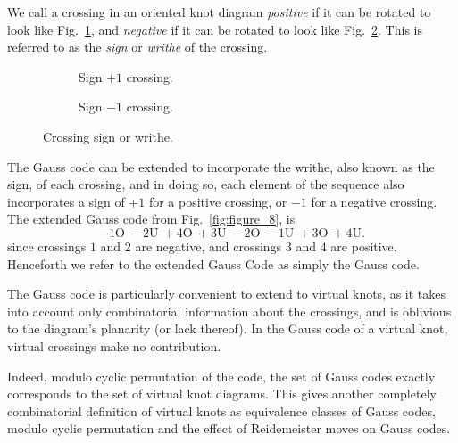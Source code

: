 \documentclass[12pt]{report}
\renewcommand{\over}{\text{O}}
\newcommand{\under}{\text{U}}
\theoremstyle{upright}
\begin{document}
We call a crossing in an oriented knot diagram \textit{positive} if it can be rotated to look like Fig.~\ref{fig:cross_pos}, and \textit{negative} if it can be rotated to look like Fig.~\ref{fig:cross_neg}. This is referred to as the \textit{sign} or \textit{writhe} of the crossing.

\begin{figure}[hbt]
	\centering
	\hspace*{\fill}
	\begin{subfigure}[b]{0.4 \textwidth}
		\centering
		\def\svgscale{0.28}
		
		\caption{Sign $+1$ crossing.}
		\label{fig:cross_pos}
	\end{subfigure}
	\hspace*{\fill} \hspace*{\fill}	\hspace*{\fill}
	\begin{subfigure}[b]{0.4 \textwidth}
		\centering
		\def\svgscale{0.28}
		
		\caption{Sign $-1$ crossing.}
		\label{fig:cross_neg}
	\end{subfigure}
	\hspace*{\fill} 
	\caption{Crossing sign or writhe.}
	\label{fig:crossing-sign}
\end{figure}

The Gauss code can be extended to incorporate the writhe, also known as the sign, of each crossing, and in doing so, each element of the sequence also incorporates a sign of $+1$ for a positive crossing, or $-1$ for a negative crossing. The extended Gauss code from Fig.~\ref{fig:figure_8}, is
\[-1\over\ -2\under\ +4\over\ +3\under\ -2\over\ -1\under\ +3\over\ +4\under.\]
since crossings $1$ and $2$ are negative, and crossings $3$ and $4$ are positive. Henceforth we refer to the extended Gauss Code as simply the Gauss code.

The Gauss code is particularly convenient to extend to virtual knots, as it takes into account only combinatorial information about the crossings, and is oblivious to the diagram's planarity (or lack thereof). In the Gauss code of a virtual knot, virtual crossings make no contribution. 

Indeed, modulo cyclic permutation of the code, the set of Gauss codes exactly corresponds to the set of virtual knot diagrams. This gives another completely combinatorial definition of virtual knots as equivalence classes of Gauss codes, modulo cyclic permutation and the effect of Reidemeister moves on Gauss codes.
\end{document}
